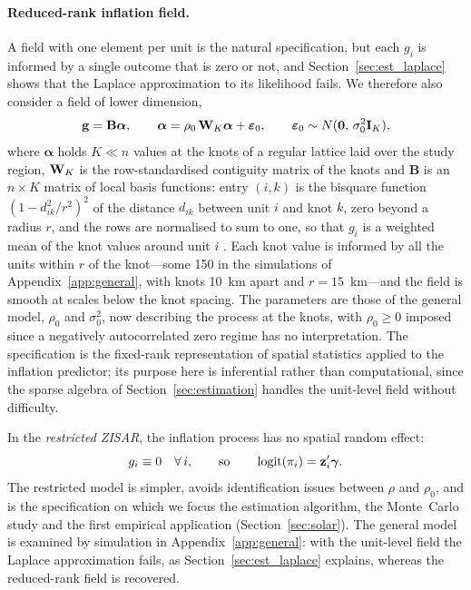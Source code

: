 \paragraph{Reduced-rank inflation field.}
A field with one element per unit is the natural specification, but each $g_i$ is informed by a single outcome that is zero or not, and Section~\ref{sec:est_laplace} shows that the Laplace approximation to its likelihood fails.
We therefore also consider a field of lower dimension,
\begin{equation}\label{eq:rr_g}
  \mathbf{g} = \mathbf{B}\boldsymbol{\alpha}, \qquad
  \boldsymbol{\alpha} = \rho_0\,\mathbf{W}_K\boldsymbol{\alpha} + \boldsymbol{\varepsilon}_0, \qquad
  \boldsymbol{\varepsilon}_0 \sim N(\mathbf{0},\,\sigma_0^2\mathbf{I}_K),
\end{equation}
where $\boldsymbol{\alpha}$ holds $K \ll n$ values at the knots of a regular lattice laid over the study region, $\mathbf{W}_K$ is the row-standardised contiguity matrix of the knots and $\mathbf{B}$ is an $n\times K$ matrix of local basis functions: entry $(i,k)$ is the bisquare function $(1 - d_{ik}^2/r^2)^2$ of the distance $d_{ik}$ between unit $i$ and knot $k$, zero beyond a radius $r$, and the rows are normalised to sum to one, so that $g_i$ is a weighted mean of the knot values around unit $i$ \citep{cressie_johannesson2008}.
Each knot value is informed by all the units within $r$ of the knot---some 150 in the simulations of Appendix~\ref{app:general}, with knots 10~km apart and $r = 15$~km---and the field is smooth at scales below the knot spacing.
The parameters are those of the general model, $\rho_0$ and $\sigma_0^2$, now describing the process at the knots, with $\rho_0 \ge 0$ imposed since a negatively autocorrelated zero regime has no interpretation.
The specification is the fixed-rank representation of spatial statistics \citep{cressie_johannesson2008} applied to the inflation predictor; its purpose here is inferential rather than computational, since the sparse algebra of Section~\ref{sec:estimation} handles the unit-level field without difficulty.

In the \emph{restricted ZISAR}, the inflation process has no spatial random effect:
\begin{equation}\label{eq:zeroinfl_restricted}
  g_i \equiv 0 \quad \forall\,i, \qquad\text{so}\qquad \operatorname{logit}(\pi_i) = \mathbf{z}_i'\boldsymbol{\gamma}.
\end{equation}
The restricted model is simpler, avoids identification issues between $\rho$ and $\rho_0$, and is the specification on which we focus the estimation algorithm, the Monte~Carlo study and the first empirical application (Section~\ref{sec:solar}).
The general model is examined by simulation in Appendix~\ref{app:general}: with the unit-level field the Laplace approximation fails, as Section~\ref{sec:est_laplace} explains, whereas the reduced-rank field is recovered.

